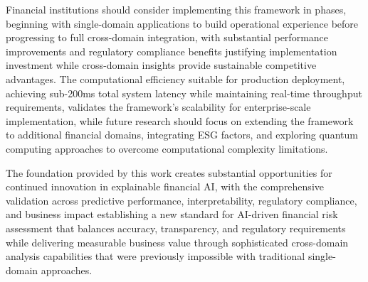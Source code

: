 \documentclass[a4paper,11pt,twoside]{article}
\newcommand{\0}{\Bf{0}}
\theoremstyle{definition}
\begin{document}
Financial institutions should consider implementing this framework in phases, beginning with single-domain applications to build operational experience before progressing to full cross-domain integration, with substantial performance improvements and regulatory compliance benefits justifying implementation investment while cross-domain insights provide sustainable competitive advantages. The computational efficiency suitable for production deployment, achieving sub-200ms total system latency while maintaining real-time throughput requirements, validates the framework's scalability for enterprise-scale implementation, while future research should focus on extending the framework to additional financial domains, integrating ESG factors, and exploring quantum computing approaches to overcome computational complexity limitations.

The foundation provided by this work creates substantial opportunities for continued innovation in explainable financial AI, with the comprehensive validation across predictive performance, interpretability, regulatory compliance, and business impact establishing a new standard for AI-driven financial risk assessment that balances accuracy, transparency, and regulatory requirements while delivering measurable business value through sophisticated cross-domain analysis capabilities that were previously impossible with traditional single-domain approaches.
\end{document}
